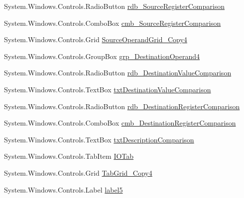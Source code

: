 \begin{DoxyCompactItemize}
\item 
System.\+Windows.\+Controls.\+Radio\+Button \hyperlink{class_c_p_u___o_s___simulator_1_1_instructions_window_afa2620b93d7d354b0632d7c290022545}{rdb\+\_\+\+Source\+Register\+Comparison}
\item 
System.\+Windows.\+Controls.\+Combo\+Box \hyperlink{class_c_p_u___o_s___simulator_1_1_instructions_window_af7acb32053b1cf27ee94bbf47efc9fbe}{cmb\+\_\+\+Source\+Register\+Comparison}
\item 
System.\+Windows.\+Controls.\+Grid \hyperlink{class_c_p_u___o_s___simulator_1_1_instructions_window_aa8c70305e3c77644ac312df74b0696b7}{Source\+Operand\+Grid\+\_\+\+Copy4}
\item 
System.\+Windows.\+Controls.\+Group\+Box \hyperlink{class_c_p_u___o_s___simulator_1_1_instructions_window_a68c2f892a54f7826baacf9c828431fa8}{grp\+\_\+\+Destination\+Operand4}
\item 
System.\+Windows.\+Controls.\+Radio\+Button \hyperlink{class_c_p_u___o_s___simulator_1_1_instructions_window_a200445a2378fddf69041aecbbcdf68fb}{rdb\+\_\+\+Destination\+Value\+Comparison}
\item 
System.\+Windows.\+Controls.\+Text\+Box \hyperlink{class_c_p_u___o_s___simulator_1_1_instructions_window_ab44686bd174144a0c1042579d6665547}{txt\+Destination\+Value\+Comparison}
\item 
System.\+Windows.\+Controls.\+Radio\+Button \hyperlink{class_c_p_u___o_s___simulator_1_1_instructions_window_af5369f91639cf92cbb6bd89118d6e373}{rdb\+\_\+\+Destination\+Register\+Comparison}
\item 
System.\+Windows.\+Controls.\+Combo\+Box \hyperlink{class_c_p_u___o_s___simulator_1_1_instructions_window_af209ebdcd0b9ae6c267388b382dac245}{cmb\+\_\+\+Destination\+Register\+Comparison}
\item 
System.\+Windows.\+Controls.\+Text\+Box \hyperlink{class_c_p_u___o_s___simulator_1_1_instructions_window_a1ac2050428b5ece7f1f6791771e9cef6}{txt\+Description\+Comparison}
\item 
System.\+Windows.\+Controls.\+Tab\+Item \hyperlink{class_c_p_u___o_s___simulator_1_1_instructions_window_aaf736178464d8313c866ab6efeae19c5}{I\+O\+Tab}
\item 
System.\+Windows.\+Controls.\+Grid \hyperlink{class_c_p_u___o_s___simulator_1_1_instructions_window_a33c64471b02aed8597462149051c2b51}{Tab\+Grid\+\_\+\+Copy4}
\item 
System.\+Windows.\+Controls.\+Label \hyperlink{class_c_p_u___o_s___simulator_1_1_instructions_window_acfbda3e1b251a166abc72a07d4cb5025}{label5}

\end{DoxyCompactItemize}
